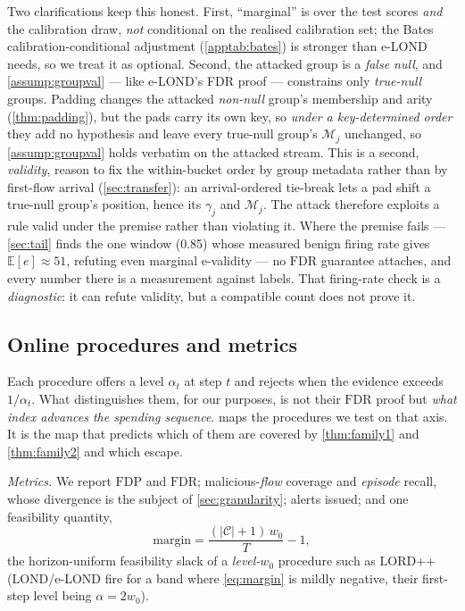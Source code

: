 \documentclass[conference]{IEEEtran}
\newcommand{\Cal}{\mathcal{C}}
\newcommand{\nCal}{\lvert\Cal\rvert}
\newcommand{\alphat}{\alpha_t}
\newcommand{\FDP}{\mathrm{FDP}}
\newcommand{\FDR}{\mathrm{FDR}}
\begin{document}
Two clarifications keep this honest. First, ``marginal'' is over the test scores \emph{and} the
calibration draw, \emph{not} conditional on the realised calibration set; the Bates calibration-conditional
adjustment (\cref{apptab:bates}) is stronger than e-LOND needs, so we treat it as optional. Second, the
attacked group is a \emph{false null}, and \cref{assump:groupval} --- like e-LOND's FDR proof ---
constrains only \emph{true-null} groups. Padding changes the attacked \emph{non-null} group's
membership and arity (\cref{thm:padding}), but the pads carry its own key, so \emph{under a
key-determined order} they add no hypothesis and leave every true-null group's $\mathcal{M}_j$
unchanged, so \cref{assump:groupval} holds verbatim on the attacked stream.
This is a second, \emph{validity}, reason to fix the within-bucket order by group metadata rather than
by first-flow arrival (\cref{sec:transfer}): an arrival-ordered tie-break lets a pad shift a true-null
group's position, hence its $\gamma_j$ and $\mathcal{M}_j$. The attack therefore exploits a rule valid
under the premise rather than violating it.
Where the premise fails --- \cref{sec:tail} finds the one window (0.85) whose measured benign firing
rate gives $\mathbb{E}[e]\approx51$, refuting even marginal e-validity --- no $\FDR$ guarantee
attaches, and every number there is a measurement against labels. That firing-rate check is a
\emph{diagnostic}: it can refute validity, but a compatible count does not prove it.

\subsection{Online procedures and metrics}

Each procedure offers a level $\alphat$ at step $t$ and rejects when the evidence exceeds
$1/\alphat$. What distinguishes them, for our purposes, is not their $\FDR$ proof but
\emph{what index advances the spending sequence}.  maps the procedures we
test on that axis. It is the map that predicts which of them are covered by \cref{thm:family1}
and \cref{thm:family2} and which escape.

\emph{Metrics.} We report $\FDP$ and $\FDR$; malicious-\emph{flow} coverage and \emph{episode}
recall, whose divergence is the subject of \cref{sec:granularity}; alerts issued; and one
feasibility quantity,
\begin{equation}\label{eq:margin}
\text{margin} = \frac{(\nCal+1)\,w_0}{T} - 1,
\end{equation}
the horizon-uniform feasibility slack of a \emph{level-$w_0$} procedure such as LORD++ (LOND/e-LOND
fire for a band where \cref{eq:margin} is mildly negative, their first-step level being
$\alpha = 2w_0$).
\end{document}
